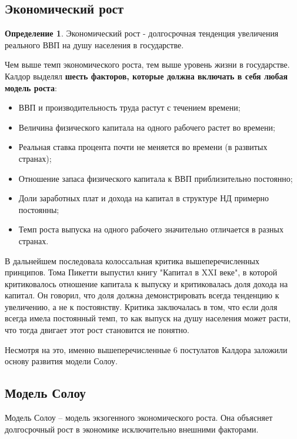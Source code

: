 \documentclass[reqno]{article}
\theoremstyle{definition}
\theoremstyle{definition}
\theoremstyle{definition}
\theoremstyle{definition}
\theoremstyle{definition}
\theoremstyle{definition}
\theoremstyle{definition}
\newtheorem*{defi}{Определение}
\theoremstyle{definition}
\theoremstyle{definition}
\begin{document}
		\subsection{Экономический рост}\label{sec:1.2}
		
		\begin{defi}
			Экономический рост - долгосрочная тенденция увеличения реального ВВП на душу населения в государстве.
		\end{defi}
		
		Чем выше темп экономического роста, тем выше уровень жизни в государстве. Калдор выделял \textbf{шесть факторов, которые должна включать в себя любая модель роста}:
		
		\begin{itemize}
			\item ВВП и производительность труда растут с течением времени;
			\item Величина физического капитала на одного рабочего растет во времени;
			\item Реальная ставка процента почти не меняется во времени (в развитых странах);
			\item Отношение запаса физического капитала к ВВП приблизительно постоянно;
			\item Доли заработных плат и дохода на капитал в структуре НД примерно постоянны;
			\item Темп роста выпуска на одного рабочего значительно отличается в разных странах.
		\end{itemize}
		
		В дальнейшем последовала колоссальная критика вышеперечисленных принципов. Тома Пикетти выпустил книгу "Капитал в XXI веке", в которой критиковалось отношение капитала к выпуску и критиковалась доля дохода на капитал. Он говорил, что доля должна демонстрировать всегда тенденцию к увеличению, а не к постоянству. Критика заключалась в том, что если доля всегда имела постоянный темп, то как выпуск на душу населения может расти, что тогда двигает этот рост становится не понятно.
		
		Несмотря на это, именно вышеперечисленные 6 постулатов Калдора заложили основу развития модели Солоу.
		
		\subsection{Модель Солоу}
		Модель Солоу -- модель экзогенного экономического роста. Она объясняет долгосрочный рост в экономике исключительно внешними факторами.
		
\end{document}
